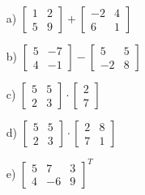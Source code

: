 \documentclass{article}
\begin{document}
\begin{itemize}
    \item[a) ]	
    			$ 
    			\begin{bmatrix}
    			1 & 2 \\
    			5 & 9
    			\end{bmatrix}
    			+
    			\begin{bmatrix}
    			-2 & 4 \\
    			6  & 1
    			\end{bmatrix}
    			$
    \item[b) ]	
    			$ 
    			\begin{bmatrix}
    			5 & -7 \\
    			4 & -1
    			\end{bmatrix}
    			-
    			\begin{bmatrix}
    			5   & 5 \\
    			-2  & 8
    			\end{bmatrix}
    			$
    			
    \item[c) ]	
    			$ 
    			\begin{bmatrix}
    			5  & 5 \\
    			2  & 3
    			\end{bmatrix}
    			\cdot
    			\begin{bmatrix}
    			2   \\
    			7  
    			\end{bmatrix}
    			$
    			
    \item[d) ]	
    			$ 
    			\begin{bmatrix}
    			5  & 5 \\
    			2  & 3
    			\end{bmatrix}
    			\cdot
    			\begin{bmatrix}
    			2 & 8  \\
    			7 & 1
    			\end{bmatrix}
    			$
    \item[e) ]	
    			$ 
    			\begin{bmatrix}
    			5 & 7  & 3 \\
    			4 & -6 & 9
    			\end{bmatrix}
    			^{T}
    			$
    		
\end{itemize}
\end{document}
